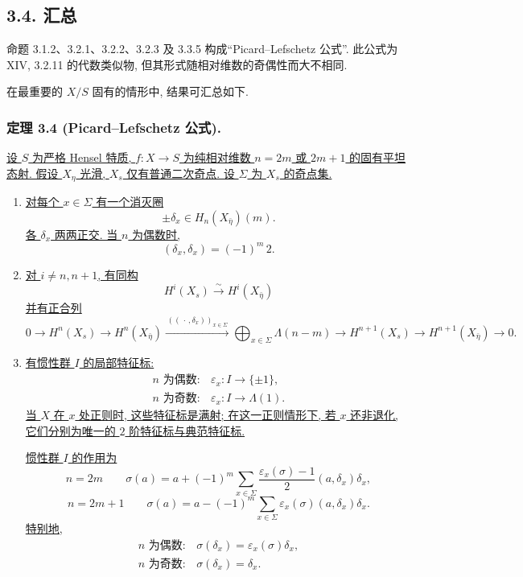 \subsection*{3.4. 汇总}

命题 3.1.2、3.2.1、3.2.2、3.2.3 及 3.3.5 构成“Picard--Lefschetz 公式”. 此公式为 XIV, 3.2.11 的代数类似物, 但其形式随相对维数的奇偶性而大不相同.

在最重要的 $X/S$ 固有的情形中, 结果可汇总如下.

\subsubsection*{定理 3.4 (Picard--Lefschetz 公式).}
\underline{设 $S$ 为严格 Hensel 特质, $f:X\to S$ 为纯相对维数 $n=2m$ 或 $2m+1$ 的固有平坦态射. 假设 $X_\eta$ 光滑, $X_s$ 仅有普通二次奇点. 设 $\Sigma$ 为 $X_s$ 的奇点集.}

\begin{enumerate}
\item[(i)] \underline{对每个 $x\in\Sigma$ 有一个消灭圈}
\[
\pm\delta_x\in H_n(X_{\bar\eta})(m).
\]
\underline{各 $\delta_x$ 两两正交. 当 $n$ 为偶数时,}
\[
(\delta_x,\delta_x)=(-1)^m\,2.
\]

\item[(ii)] \underline{对 $i\ne n,n+1$, 有同构}
\[
H^i(X_s)\xrightarrow{\ \sim\ }H^i(X_{\bar\eta})
\]
\underline{并有正合列}
\[
0\longrightarrow H^n(X_s)
 \longrightarrow H^n(X_{\bar\eta})
 \xrightarrow{\,((\,\cdot\,,\delta_x))_{x\in\Sigma}\,}
 \bigoplus_{x\in\Sigma}\Lambda(n-m)
 \longrightarrow H^{n+1}(X_s)
 \longrightarrow H^{n+1}(X_{\bar\eta})
 \longrightarrow0.
\]

\item[(iii)] \underline{有惯性群 $I$ 的局部特征标:}
\[
\begin{array}{lll}
n\text{ 为偶数}:&\varepsilon_x:I\longrightarrow\{\pm1\},\\[2pt]
n\text{ 为奇数}:&\varepsilon_x:I\longrightarrow\Lambda(1).
\end{array}
\]
\underline{当 $X$ 在 $x$ 处正则时, 这些特征标是满射; 在这一正则情形下, 若 $x$ 还非退化, 它们分别为唯一的 $2$ 阶特征标与典范特征标.}

\underline{惯性群 $I$ 的作用为}
\[
n=2m\qquad
\sigma(a)=a+(-1)^m\sum_{x\in\Sigma}
 \frac{\varepsilon_x(\sigma)-1}{2}
 (a,\delta_x)\delta_x,
\]
\[
n=2m+1\qquad
\sigma(a)=a-(-1)^m\sum_{x\in\Sigma}
 \varepsilon_x(\sigma)(a,\delta_x)\delta_x.
\]
\underline{特别地,}
\[
\begin{array}{lll}
n\text{ 为偶数}:&\sigma(\delta_x)=\varepsilon_x(\sigma)\delta_x,\\[2pt]
n\text{ 为奇数}:&\sigma(\delta_x)=\delta_x.
\end{array}
\]
\end{enumerate}